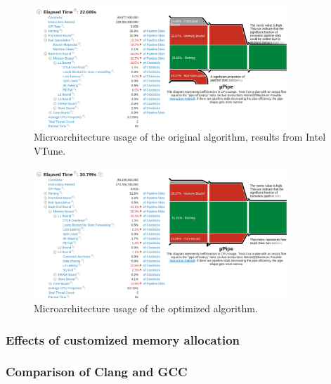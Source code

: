 \documentclass[12pt]{article}
\begin{document}
\begin{figure}[H]
	\begin{center}
		\includegraphics[width=0.85\textwidth]{velout_uarch_overall_orig}
	\end{center}
	\caption{Microarchitecture usage of the original algorithm, results from Intel VTune.}
	\label{fig_velout_uarch_overall_orig}
\end{figure}

\begin{figure}[H]
	\begin{center}
		\includegraphics[width=0.85\textwidth]{velout_uarch_overall_opt}
	\end{center}
	\caption{Microarchitecture usage of the optimized algorithm.}
	\label{fig_velout_uarch_overall_opt}
\end{figure}


\subsubsection{Effects of customized memory allocation}

\subsubsection{Comparison of Clang and GCC}



\end{document}
